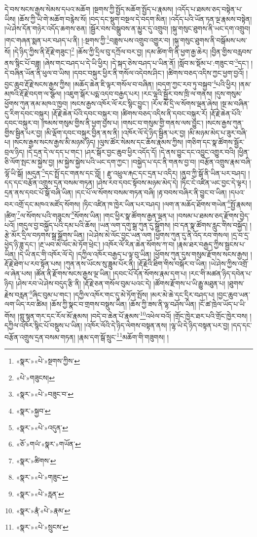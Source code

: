དེ་བས་སངས་རྒྱས་སེམས་དཔའ་མཆོག །སྔགས་ཀྱི་སྤྱོད་མཆོག་སྤྱོད་པ་རྣམས། །འདོད་པ་ཐམས་ཅད་བསྟེན་པ་ཡིས། །ཆོས་ཀྱི་ཡི་གེ་མཆོག་བརྙེས་སོ། །བད་དང་སྡུག་བསྔལ་དེ་བདག་མིན། །འདོད་པའི་ཡོན་ཏན་ལྔ་རྣམས་བསྟེན། །ཡེ་ཤེས་དོན་གཉེར་འདོད་ཆགས་ཅན། །སྦྱོར་བས་བསྒྲུབས་ན་མྱུར་དུ་འགྲུབ། །སྐུ་གསུང་ཐུགས་ནི་ཡང་དག་འགྲུབ། །གང་གཞན་སྨན་པར་བཤད་པ་ནི། །:སྔགས་ཀྱི་\footnote{«སྣར་»«པེ་»སྔགས་ཀྱིས་}བཟླས་པས་འགྲུབ་འགྱུར་བ། །སྐུ་གསུང་ཐུགས་ནི་བསྒོམས་པས་སོ། །དེ་ཉིད་ཀྱིས་ནི་རྡོ་རྗེ་གཟུང་།\footnote{«པེ་»གཟུངས།} །ཆོས་ཀྱི་དྲིལ་བུ་དཀྲོལ་བར་བྱ། །དམ་ཚིག་གི་ནི་ཕྱག་རྒྱ་ཆེར། །བྱིན་གྱིས་བརླབས་ནས་སྙིང་པོ་བཟླ། །ཞེས་གང་བཤད་པ་དེ་ཡི་ཕྱིར། །དེ་སྐད་ཅེས་བཤད་པ་ཡིན་ནོ། །སློབ་མ་སྡོམ་པ་:གཟུང་བ་\footnote{«སྣར་»«པེ་»བཟུང་བ་}དང་། །དེ་བཞིན་ཡོན་ནི་ཕུལ་བ་ཡིས། །དབང་བསྐུར་ཕྱིར་ནི་གསོལ་འདེབས་ཤིང་། །ཚིགས་བཅད་འདིས་ཀྱང་ཕྱག་བྱའོ། །བྱང་ཆུབ་རྡོ་རྗེ་སངས་རྒྱས་ཀྱིས། །མཆོད་ཆེན་ཇི་ལྟར་གསོལ་བ་བཞིན། །བདག་ཀྱང་རབ་ཏུ་བསྐྱབ་\footnote{«སྣར་»སྐྱབ་}པའི་ཕྱིར། །ནམ་མཁའི་རྡོ་རྗེ་བདག་ལ་སྩོལ། །འཇུག་སྒོར་པདྨ་འདབ་བརྒྱད་པར། །རང་ལྷའི་སྦྱོར་བས་ཁྲི་ལ་གནས། །དུས་གསུམ་ཕྱོགས་ཀུན་ནམ་མཁའ་ཁྱབ། །སངས་རྒྱས་འཁོར་ལོ་རང་སྙིང་བྱུང་། །རོལ་མོ་དྲི་ལ་སོགས་ལྡན་ཞེས། །སྔ་མ་བཞིན་དུ་རིག་དབང་བསྐུར། །རྡོ་རྗེ་ཆེན་པོའི་དབང་བསྐུར་བ། །ཚིགས་བཅད་འདིས་ནི་དབང་བསྐུར་རོ། །རྡོ་རྗེ་ཆེན་པོའི་དབང་བསྐུར་བ། །ཁམས་གསུམ་གྱིས་ནི་ཕྱག་བྱས་པ། །གསང་བ་གསུམ་གྱི་གནས་ལས་བྱུང་། །སངས་རྒྱས་ཀུན་གྱིས་སྦྱིན་པར་བྱ། །མི་ལྡོག་དབང་བསྐུར་བྱིན་ནས་ནི། །འཁོར་ལོ་དེ་ཉིད་སྦྱིན་པར་བྱ། །མི་མཉམ་མེད་པ་ཟུར་བཞི་པ། །སངས་རྒྱས་སངས་རྒྱས་མི་མཉམ་ཉིད། །ལུས་ཚོར་སེམས་དང་ཆོས་རྣམས་ཀྱིས། །གཅིག་དང་སྣ་ཚོགས་སྦྱོར་བྲལ་ཉིད། །དེ་དྲན་དེ་ལ་དད་པ་གང་། །ཤར་སྒོར་བྱང་ཆུབ་ཕྱིར་འདོད་དོ། །དེ་ནས་བྱུང་དང་འབྱུང་འགྱུར་བའི། །ཕྱིན་ཅི་ལོག་སྤང་མ་སྐྱེས་བྱ། །མ་སྐྱེས་སྐྱེས་པའི་ཡང་དག་ཀྱང་། །བསྐྱེད་པ་དང་ནི་གནས་བྱ་བ། །བརྩོན་འགྲུས་རྣམ་བཞི་ལྷོ་ཡི་སྒོ། །མདུན་\footnote{«སྣར་»«པེ་»འདུན་}དང་སྤྲོ་དང་གནས་དང་བློ། །
རྫུ་འཕྲུལ་རྐང་དང་དྲན་པ་འདིར། །ནུབ་ཀྱི་སྒོ་ནི་ཡིན་པར་བཤད། །དད་དང་བརྩོན་འགྲུས་དྲན་བསམ་གཏན། །ཤེས་རབ་དབང་སྟོབས་མཉམ་མེད་དེ། །ཏིང་ངེ་འཛིན་ཡང་བྱང་དེ་ལྟར། །དྲན་ནས་དབང་པོ་སྒོ་བཞི་ཡིན། །དང་པོ་ལ་སོགས་བསམ་གཏན་བཞི། །རྟ་བབས་བཞིར་ནི་བྱུང་བ་ཡིན། །དཔའ་བར་འགྲོ་དང་མཁའ་མཛོད་སོགས། །ཏིང་འཛིན་ཁ་ཁྱེར་ཡིན་པར་བཤད། །ལག་ན་མཆོད་ཐོགས་གཡེན་\footnote{«ཅོ་»གཡཾ་«སྣར་»གཡོན་}སྤྱོ་རྣམས། །ཚིག་\footnote{«སྣར་»ཚིགས་}ལ་སོགས་པའི་གཟུངས་\footnote{«སྣར་»«པེ་»གཟུང་}སོགས་ཡིན། །གང་ཕྱིར་སྣ་ཚོགས་རྒྱན་ལྡན་པ། །བསམ་པ་ཐམས་ཅད་རྫོགས་བྱེད་པའོ། །གདུལ་བྱ་བསྐྱོད་པའི་དམ་པའི་ཆོས། །ཡན་ལག་དགུ་སྒྲ་ཀུན་དུ་སྒྲོགས། །བ་དན་སྣ་ཚོགས་རླུང་གིས་བསྐྱོད། །རྩེ་མོར་དྲིལ་བཏགས་སྒྲ་སྒྲོགས་ཡིན། །ཡེ་ཤེས་མེ་ལོང་བྱང་ཡན་ལག །ཕྱོགས་ཀུན་དུ་ནི་འོད་རབ་གསལ། །དྲ་བ་དྲ་ཕྱེད་ཉི་ཟླ་དང་། །རྔ་ཡབ་མེ་ལོང་མེ་ཏོག་ཕྲེང་། །འཁོར་ལོ་རིན་ཆེན་སོགས་ཀ་བ། །རྣམ་ཐར་བརྒྱད་ཀྱིས་སྦྱངས་པ་ཡིན། །དེ་ཡི་ནང་གི་འཁོར་ལོ་དེ། །དཀྱིལ་འཁོར་བརྒྱད་པ་ལྟ་བུ་ཡིན། །ཕྱོགས་ཀུན་དུས་གསུམ་རྫོགས་སངས་རྒྱས། །རྡོ་རྗེ་ཐེག་པ་རབ་སྟོན་པས། །ཀུན་ནས་ཡོངས་སུ་ཟླུམ་པོར་ནི། །རྡོ་རྗེའི་ཐིག་གིས་བསྐོར་བ་ཡིན། །ཡེ་ཤེས་ཀྱིས་འགྲོ་ལ་ཞེན་པས། །ཚོན་ནི་རྫོགས་སངས་རྒྱས་ལྔ་ཡིན། །དབང་པོ་དོན་སོགས་རྣམ་དག་པ། །རང་གི་མཚན་ཉིད་དབེན་པ་ཉིད། །ཤེས་རབ་ཡེ་ཤེས་བདུད་རྩི་ནི། །རྡོ་རྗེ་ཅན་གསོལ་བུམ་པའང་དེ། །ཚོགས་རྫོགས་པ་ཡི་རྒྱུ་མཐུན་པ། །ཐུགས་རྗེས་བརླན་\footnote{«སྣར་»«པེ་»རླན་}ཞིང་བུམ་པ་གང་། །དཀྱིལ་འཁོར་གང་དུ་མེ་ཏོག་སྤོས། །མར་མེ་ཆེ་དང་དྲིར་བཤད་པ། །བྱང་ཆུབ་ཡན་ལག་ཡིད་རབ་ཚིམ། །ཆོས་ཀྱི་སྣང་བ་གྲགས་བསྡུས་ཡིན། །ཆོས་ཀྱི་ཟས་ནི་ལྷ་བཤོས་ཡིན། །ངོ་ཚ་ཁྲེལ་ཡོད་པ་ཡི་གོས། །གླུ་སྙན་གར་དང་རོལ་མོ་རྣམས། །བདེ་བ་ཆེན་པོ་རྣམས་\footnote{«སྣར་»རྣཾ་«པེ་»རྣམ་}འཕེལ་བའོ། །གྲོང་ཁྱེར་ཐར་པའི་གྲོང་ཁྱེར་བས། །དཀྱིལ་འཁོར་སྙིང་པོ་བསྡུས་པ་ཡིན། །འཁོར་ལོའི་དེ་ཉིད་ལེགས་བསྟན་ནས། །ལྷ་ཡི་དེ་ཉིད་བསྟན་པར་བྱ། །དད་དང་བརྩོན་འགྲུས་དྲན་བསམ་གཏན། །རྣམ་དག་སྒོ་སྲུང་\footnote{«སྣར་»«པེ་»སྲུངས་}མཆོག་གི་གཟུགས། །
